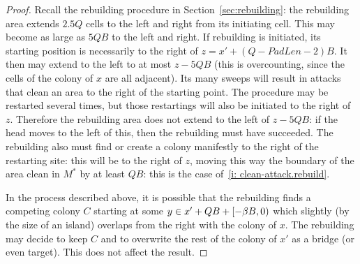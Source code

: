 \documentclass[11pt]{memoir}
\theoremstyle{definition} %
\def\B{B}
\newcommand{\Q}{Q}
\newcommand{\PadLen}{\mathit{PadLen}}
\newcommand{\cns}[1]{c_{\textrm{\upshape #1}}}
\newcommand{\CSpill}{\cns{spill}}
\begin{document}
\begin{proof}
Recall the rebuilding procedure in Section~\ref{sec:rebuilding}:
the rebuilding area extends \( 2.5\Q \) cells to the left and right from its initiating cell.
This may become as large as \( 5\Q\B \) to the left and right.
If rebuilding is initiated, its starting position
is necessarily to the right of \( z=x'+(\Q-\PadLen-2)\B \).
It then may extend to the left to at most \( z-5\Q\B \) (this is overcounting,
since the cells of the colony of \( x \) are all adjacent).
Its many sweeps will result in attacks that clean an area to the right of the starting point.
The procedure may be restarted several times, but those restartings will also be initiated
to the right of \( z \).
Therefore the rebuilding area does not extend to the left of \( z-5\Q\B \):
if the head moves to the left of this, then the rebuilding must have succeeded.
The rebuilding also must find or create a colony manifestly to the right of the restarting site: this will be
to the right of \( z \), moving this way the boundary of the area clean in \( M^{*} \) 
by at least \( \Q\B \): this is the case of~\eqref{i: clean-attack.rebuild}.

In the process described above,
it is possible that the rebuilding finds a competing colony \( C \)
starting at some \( y \in x'+\Q\B + \lint{-\beta\B}{0}\) which
slightly (by the size of an island) overlaps from the right with the colony of \( x \).
The rebuilding may decide to keep \( C \) and to overwrite the rest of the colony of \( x' \) as a bridge
(or even target).
This does not affect the result.
\end{proof}



\end{document}
